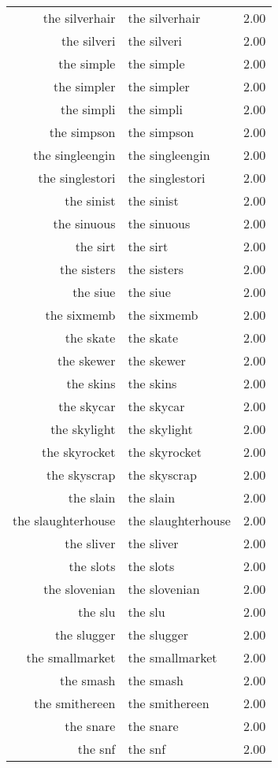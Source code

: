 \begin{table}[ht]
\begin{tabular}{rlr}
  the silverhair & the silverhair & 2.00 \\ 
  the silveri & the silveri & 2.00 \\ 
  the simple & the simple & 2.00 \\ 
  the simpler & the simpler & 2.00 \\ 
  the simpli & the simpli & 2.00 \\ 
  the simpson & the simpson & 2.00 \\ 
  the singleengin & the singleengin & 2.00 \\ 
  the singlestori & the singlestori & 2.00 \\ 
  the sinist & the sinist & 2.00 \\ 
  the sinuous & the sinuous & 2.00 \\ 
  the sirt & the sirt & 2.00 \\ 
  the sisters & the sisters & 2.00 \\ 
  the siue & the siue & 2.00 \\ 
  the sixmemb & the sixmemb & 2.00 \\ 
  the skate & the skate & 2.00 \\ 
  the skewer & the skewer & 2.00 \\ 
  the skins & the skins & 2.00 \\ 
  the skycar & the skycar & 2.00 \\ 
  the skylight & the skylight & 2.00 \\ 
  the skyrocket & the skyrocket & 2.00 \\ 
  the skyscrap & the skyscrap & 2.00 \\ 
  the slain & the slain & 2.00 \\ 
  the slaughterhouse & the slaughterhouse & 2.00 \\ 
  the sliver & the sliver & 2.00 \\ 
  the slots & the slots & 2.00 \\ 
  the slovenian & the slovenian & 2.00 \\ 
  the slu & the slu & 2.00 \\ 
  the slugger & the slugger & 2.00 \\ 
  the smallmarket & the smallmarket & 2.00 \\ 
  the smash & the smash & 2.00 \\ 
  the smithereen & the smithereen & 2.00 \\ 
  the snare & the snare & 2.00 \\ 
  the snf & the snf & 2.00 \\ 

\end{tabular}
\end{table}
